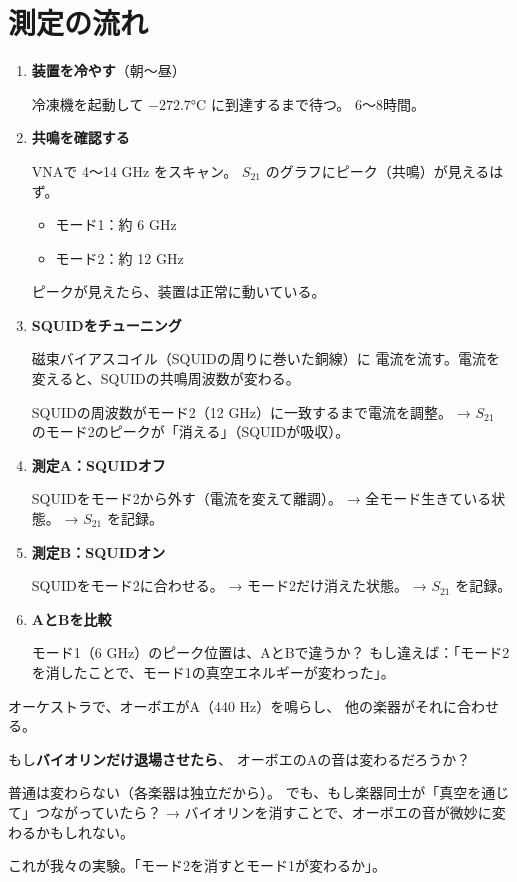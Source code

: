 \documentclass[12pt,a4paper]{article}
\begin{document}
\section{測定の流れ}

\begin{tukurubox}[ステップバイステップ]
\begin{enumerate}
\item \textbf{装置を冷やす}（朝〜昼）

冷凍機を起動して $-272.7$°C に到達するまで待つ。
6〜8時間。

\item \textbf{共鳴を確認する}

VNAで 4〜14 GHz をスキャン。
$S_{21}$ のグラフにピーク（共鳴）が見えるはず。

\begin{itemize}
\item モード1：約 6 GHz
\item モード2：約 12 GHz
\end{itemize}

ピークが見えたら、装置は正常に動いている。

\item \textbf{SQUIDをチューニング}

磁束バイアスコイル（SQUIDの周りに巻いた銅線）に
電流を流す。電流を変えると、SQUIDの共鳴周波数が変わる。

SQUIDの周波数がモード2（12 GHz）に一致するまで電流を調整。
→ $S_{21}$ のモード2のピークが「消える」（SQUIDが吸収）。

\item \textbf{測定A：SQUIDオフ}

SQUIDをモード2から外す（電流を変えて離調）。
→ 全モード生きている状態。
→ $S_{21}$ を記録。

\item \textbf{測定B：SQUIDオン}

SQUIDをモード2に合わせる。
→ モード2だけ消えた状態。
→ $S_{21}$ を記録。

\item \textbf{AとBを比較}

モード1（6 GHz）のピーク位置は、AとBで違うか？
もし違えば：「モード2を消したことで、モード1の真空エネルギーが変わった」。
\end{enumerate}
\end{tukurubox}

\begin{tatoebabox}
オーケストラで、オーボエがA（440 Hz）を鳴らし、
他の楽器がそれに合わせる。

もし\textbf{バイオリンだけ退場させたら}、
オーボエのAの音は変わるだろうか？

普通は変わらない（各楽器は独立だから）。
でも、もし楽器同士が「真空を通じて」つながっていたら？
→ バイオリンを消すことで、オーボエの音が微妙に変わるかもしれない。

これが我々の実験。「モード2を消すとモード1が変わるか」。
\end{tatoebabox}
\end{document}
